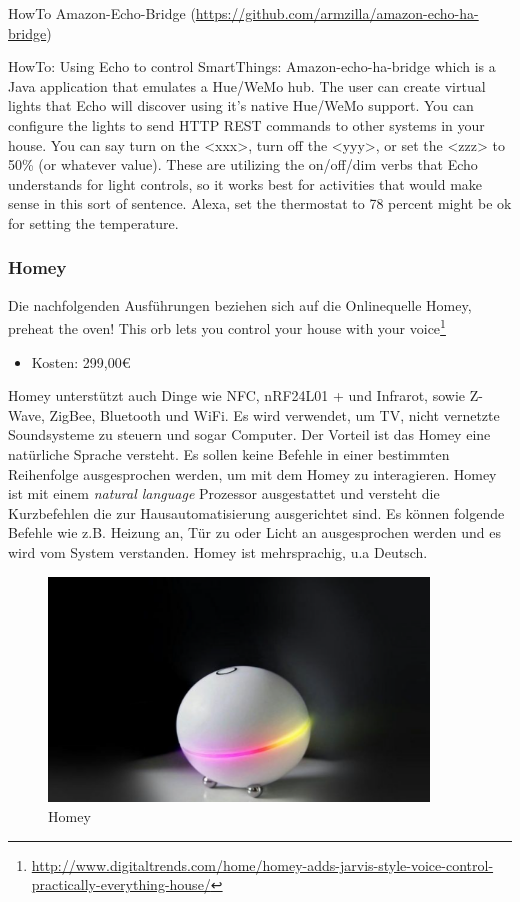 HowTo Amazon-Echo-Bridge (\url{https://github.com/armzilla/amazon-echo-ha-bridge})

\noindent
\glqq HowTo: Using Echo to control SmartThings:
Amazon-echo-ha-bridge which is a Java application that emulates a Hue/WeMo hub. The user can
create virtual \glqq lights\grqq{} that Echo will discover using it's native Hue/WeMo support. You can configure the \glqq lights\grqq{} to send HTTP REST commands to other systems in your house. You can say \glqq turn on the <xxx>\grqq , \glqq turn off the <yyy>\grqq , or \glqq set the <zzz> to 50\%\grqq{} (or whatever value). These are utilizing the on/off/dim verbs that Echo understands for light controls, so it works best for activities that would make sense in this sort of sentence. \glqq Alexa, set the thermostat to 78 percent\grqq{} might be ok for setting the temperature.\grqq

\subsubsection{Homey}
Die nachfolgenden Ausführungen beziehen sich auf die Onlinequelle \glqq Homey, preheat the oven! This orb lets you control your house with your voice\grqq\footnote{\url{http://www.digitaltrends.com/home/homey-adds-jarvis-style-voice-control-practically-everything-house/}}

\begin{itemize}
\item Kosten: 299,00€
\end{itemize}

\noindent
Homey unterstützt auch Dinge wie NFC, nRF24L01 + und Infrarot, sowie Z-Wave, ZigBee,
Bluetooth und WiFi. Es wird verwendet, um TV, nicht vernetzte Soundsysteme zu steuern und sogar
Computer. Der Vorteil ist das Homey eine natürliche Sprache versteht. Es sollen keine Befehle in einer bestimmten Reihenfolge ausgesprochen werden, um mit dem Homey zu interagieren. Homey ist mit einem \emph{natural language} Prozessor ausgestattet und versteht die Kurzbefehlen die zur Hausautomatisierung ausgerichtet sind. Es können folgende Befehle wie z.B. \glqq Heizung an\grqq , \glqq Tür zu\grqq{} oder \glqq Licht an\grqq{} ausgesprochen werden und es wird vom System verstanden. Homey ist mehrsprachig, u.a Deutsch.

\begin{figure}[h!]
	\centering
	\includegraphics[width=0.9\textwidth]{img/Feedback-Mechanismen/Homey.png}
	\caption{Homey}
	\label{fig:feedbackHomey}
\end{figure}

